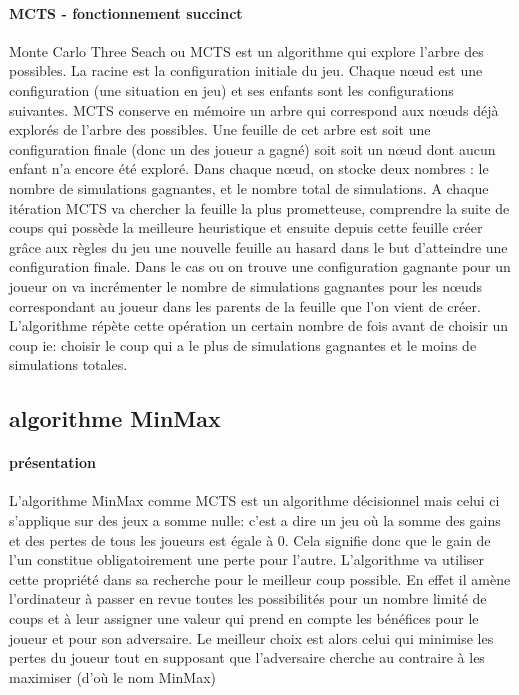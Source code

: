 \paragraph {MCTS - fonctionnement succinct}
Monte Carlo Three Seach ou MCTS est un algorithme qui explore l'arbre des possibles. La racine est la configuration initiale du jeu.
Chaque nœud est une configuration (une situation en jeu) et ses enfants sont les configurations suivantes. MCTS conserve en mémoire un arbre qui correspond aux nœuds déjà explorés de l'arbre des possibles. Une feuille de cet arbre est soit une configuration finale (donc un des joueur a gagné) soit
soit un nœud dont aucun enfant n'a encore été exploré. Dans chaque nœud, on stocke deux nombres : le nombre de simulations gagnantes, et le nombre total de simulations. 
A chaque itération MCTS va chercher la feuille la plus prometteuse, comprendre la suite de coups qui possède la meilleure heuristique
et ensuite depuis cette feuille créer grâce aux règles du jeu une nouvelle feuille au hasard dans le but d'atteindre une configuration finale.
Dans le cas ou on trouve une configuration gagnante pour un joueur on va incrémenter le nombre de simulations gagnantes pour les nœuds
correspondant au joueur dans les parents de la feuille que l'on vient de créer.
L'algorithme répète cette opération un certain nombre de fois avant de choisir un coup ie: choisir le coup qui a le plus de simulations
gagnantes et le moins de simulations totales.



\subsection {algorithme MinMax}

\paragraph {présentation}
L'algorithme MinMax comme MCTS est un algorithme décisionnel mais celui ci s'applique sur des jeux a somme nulle: c'est a dire
un jeu où la somme des gains et des pertes de tous les joueurs est égale à 0. Cela signifie donc que le gain de l'un constitue 
obligatoirement une perte pour l'autre. L'algorithme va utiliser cette propriété dans sa recherche pour le meilleur coup possible.
En effet il amène l'ordinateur à passer en revue toutes les possibilités pour un nombre limité de coups et à leur assigner une valeur 
qui prend en compte les bénéfices pour le joueur et pour son adversaire. Le meilleur choix est alors celui qui minimise les pertes 
du joueur tout en supposant que l'adversaire cherche au contraire à les maximiser (d'où le nom MinMax)

